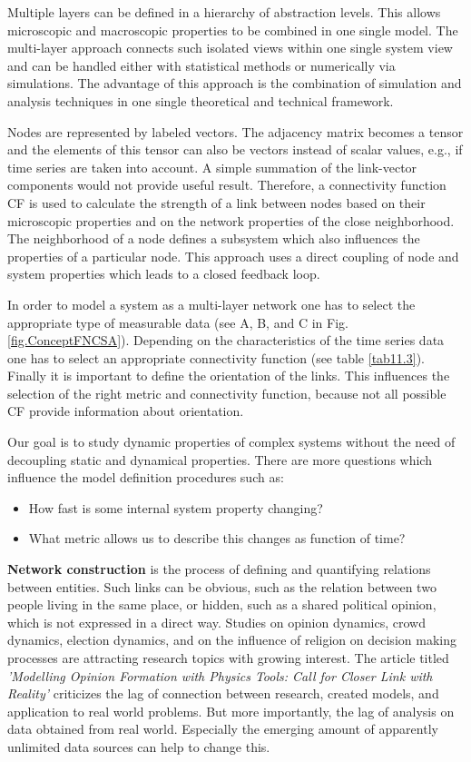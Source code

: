 \documentclass[a4paper,10pt]{scrbook}
\begin{document}
Multiple layers can be defined in a hierarchy of abstraction levels. This allows microscopic and macroscopic properties to be combined in one single model. The multi-layer approach connects such isolated views within one single system view and can be handled either with statistical methods or numerically via simulations. The advantage of this approach is the combination of simulation and analysis techniques in one single theoretical and technical framework.

Nodes are represented by labeled vectors. The adjacency matrix becomes a tensor and the elements of this tensor can also be vectors instead of scalar values, e.g., if time series are taken into account. A simple summation of the link-vector components would not provide useful result. Therefore, a connectivity function CF is used to calculate the strength of a link between nodes based on their microscopic properties and on the network properties of the close neighborhood. The neighborhood of a node defines a subsystem which also influences the properties of a particular node. This approach uses a direct coupling of node and system properties which leads to a closed feedback loop. 

In order to model a system as a multi-layer network one has to select the appropriate type of measurable data (see A, B, and C in Fig. \ref{fig.ConceptFNCSA}). Depending on the characteristics of the time series data one has to select an appropriate connectivity function (see table \ref{tab11.3}). Finally it is important to define the orientation of the links. This influences the selection of the right metric and connectivity function, because not all possible CF provide information about orientation. 

Our goal is to study dynamic properties of complex systems without the need of decoupling static and dynamical properties. There are more questions which influence the model definition procedures such as:
\begin{itemize}
	\item How fast is some internal system property changing?
	\item What metric allows us to describe this changes as function of time? 
\end{itemize}
\textbf{Network construction} is the process of defining and quantifying relations between entities. Such links can be obvious, such as the relation between two people living in the same place, or hidden, such as a shared political opinion, which is not expressed in a direct way. Studies on opinion dynamics, crowd dynamics, election dynamics, and on the influence of religion on decision making processes are attracting research topics with growing interest. The article titled \textit{'Modelling Opinion Formation with Physics Tools: Call for Closer Link with Reality'} \cite{Sobkowicz2009} criticizes the lag of connection between research, created models, and application to real world problems. But more importantly, the lag of analysis on data obtained from real world. Especially the emerging amount of apparently unlimited data sources can help to change this. 
\end{document}
